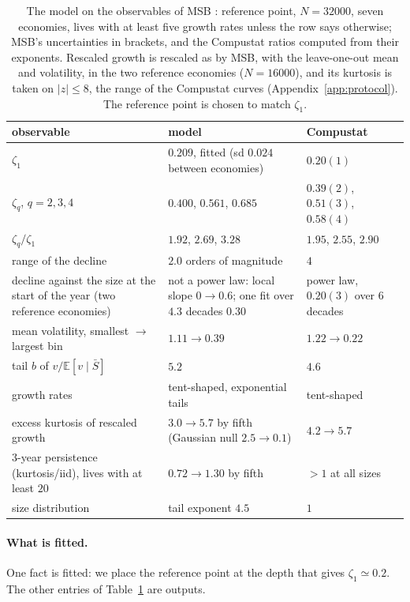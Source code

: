 \documentclass[pre,twocolumn,superscriptaddress,nofootinbib]{revtex4-2}
\newcommand{\E}{\mathbb E}
\newcommand{\Sb}{\bar S}
\begin{document}
\begin{table}[t]
\caption{The model on the observables of MSB \cite{moran2024}: reference point, $N=32000$, seven economies, lives
with at least five growth rates unless the row says otherwise; MSB's uncertainties in brackets, and the Compustat
ratios computed from their exponents.  Rescaled growth is rescaled as by MSB, with the leave-one-out mean and
volatility, in the two reference economies ($N=16000$), and its kurtosis is taken on $|z|\le8$, the range of the
Compustat curves (Appendix~\ref{app:protocol}).  The reference point is chosen to match $\zeta_1$.}
\label{tab:facts}
\begin{ruledtabular}
\begin{tabular}{p{5.6cm}p{6.6cm}p{4.8cm}}
\raggedright observable & \raggedright model & \raggedright Compustat\tabularnewline
\hline
\raggedright $\zeta_1$ & \raggedright $0.209$, fitted (sd $0.024$ between economies) & \raggedright $0.20(1)$\tabularnewline
\raggedright $\zeta_q$, $q=2,3,4$ & \raggedright $0.400$, $0.561$, $0.685$ & \raggedright $0.39(2)$, $0.51(3)$, $0.58(4)$\tabularnewline
\raggedright $\zeta_q/\zeta_1$ & \raggedright $1.92$, $2.69$, $3.28$ & \raggedright $1.95$, $2.55$, $2.90$\tabularnewline
\raggedright range of the decline & \raggedright $2.0$ orders of magnitude & \raggedright $4$\tabularnewline
\raggedright decline against the size at the start of the year (two reference economies) & \raggedright not a power
law: local slope $0\to0.6$; one fit over $4.3$ decades $0.30$ & \raggedright power law, $0.20(3)$ over $6$ decades
\cite{amaral1997}\tabularnewline
\raggedright mean volatility, smallest $\to$ largest bin & \raggedright $1.11\to0.39$ & \raggedright $1.22\to0.22$\tabularnewline
\raggedright tail $b$ of $v/\E[v\mid\Sb]$ & \raggedright $5.2$ &\raggedright $4.6$\tabularnewline
\raggedright growth rates & \raggedright tent-shaped, exponential tails & \raggedright tent-shaped\tabularnewline
\raggedright excess kurtosis of rescaled growth & \raggedright $3.0\to5.7$ by fifth (Gaussian null $2.5\to0.1$) & \raggedright $4.2\to5.7$\tabularnewline
\raggedright 3-year persistence (kurtosis/iid), lives with at least $20$ & \raggedright $0.72\to1.30$ by fifth & \raggedright $>1$ at all sizes\tabularnewline
\raggedright size distribution & \raggedright tail exponent $4.5$ & \raggedright $1$ \cite{axtell2001}\tabularnewline
\end{tabular}
\end{ruledtabular}
\end{table}

\paragraph{What is fitted.}  One fact is fitted: we place the reference point at the depth that gives
$\zeta_1\simeq0.2$.  The other entries of Table~\ref{tab:facts} are outputs.
\end{document}

